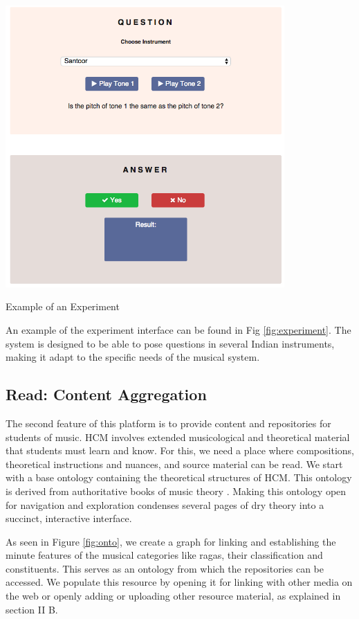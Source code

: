 \documentclass{tufte-handout}
\begin{document}
\begin{marginfigure}
\centering
    \includegraphics[width=0.8\textwidth]{expt1.png}
\caption{Example of an Experiment}
\label{fig:experiment}
\end{marginfigure}

An example of the experiment interface can be found in Fig  \ref{fig:experiment}. The system is designed to be able to pose questions in several Indian instruments, making it adapt to the specific needs of the musical system. 

\subsection{Read: Content Aggregation}
The second feature of this platform is to provide content and repositories for students of music. HCM involves extended musicological and theoretical material that students must learn and know. For this, we need a place where compositions, theoretical instructions and nuances, and source material can be read. We start with a base ontology containing the theoretical structures of HCM. This ontology is derived from authoritative books of music theory \cite{bhatkhande, kramik}. Making this ontology open for navigation and exploration condenses several pages of dry theory into a succinct, interactive interface.

As seen in Figure \ref{fig:onto}, we create a graph for linking and establishing the minute features of the musical categories like ragas, their classification and constituents. This serves as an ontology from which the repositories can be accessed. We populate this resource by opening it for linking with other media on the web or openly adding or uploading other resource material, as explained in section II B.
  
\end{document}
